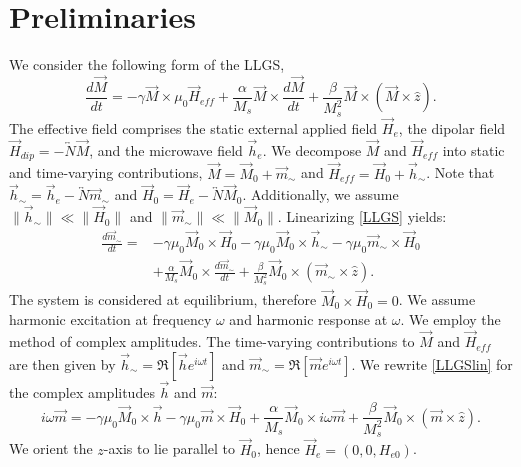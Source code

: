 \documentclass{article}
\begin{document}
\section{Preliminaries}
We consider the following form of the LLGS,
\begin{equation}\label{LLGS}
\frac{d\vec{M}}{dt} = -\gamma \vec{M} \times \mu_{0} \vec{H}_{eff} + \frac{\alpha}{M_{s}} \vec{M} \times \frac{d\vec{M}}{dt} + \frac{\beta}{M_{s}^2}\vec{M} \times (\vec{M} \times \hat{z}).
\end{equation}
The effective field comprises the static external applied field $\vec{H}_{e}$, the dipolar field $\vec{H}_{dip} = - \overleftrightarrow{N} \vec{M}$, and the microwave field $\vec{h}_{e}$. 
We decompose $\vec{M}$ and $\vec{H}_{eff}$ into static and time-varying contributions, $\vec{M} = \vec{M}_{0} + \vec{m}_{\sim}$ and $\vec{H}_{eff} = \vec{H}_{0} + \vec{h}_{\sim}$. 
Note that $\vec{h}_{\sim} = \vec{h}_{e} - \overleftrightarrow{N} \vec{m}_{\sim}$ and $\vec{H}_{0} = \vec{H}_{e} - \overleftrightarrow{N} \vec{M}_{0}$. 
Additionally, we assume $\| \vec{h}_{\sim} \| \ll \| \vec{H}_{0} \|$ and $\| \vec{m}_{\sim} \| \ll \| \vec{M}_{0} \|$. 
Linearizing \eqref{LLGS} yields:
\begin{align}\label{LLGSlin}
\frac{d\vec{m}_{\sim}}{dt} = &- \gamma \mu_{0} \vec{M}_{0} \times \vec{H}_{0} - \gamma \mu_{0} \vec{M}_{0} \times \vec{h}_{\sim} - \gamma \mu_{0} \vec{m}_{\sim} \times \vec{H}_{0} \nonumber \\
& + \frac{\alpha}{M_{s}} \vec{M}_{0} \times \frac{d\vec{m}_{\sim}}{dt} + \frac{\beta}{M_{s}^2} \vec{M}_{0} \times ( \vec{m}_{\sim} \times \hat{z} ).
\end{align}
The system is considered at equilibrium, therefore $\vec{M}_{0} \times \vec{H}_{0} = 0$. 
We assume harmonic excitation at frequency $\omega$ and harmonic response at $\omega$. 
We employ the method of complex amplitudes. 
The time-varying contributions to $\vec{M}$ and $\vec{H}_{eff}$ are then given by $\vec{h}_{\sim} = \Re [ \vec{h} e^{i \omega t} ]$ and $\vec{m}_{\sim} = \Re [ \vec{m} e^{i \omega t} ]$.
We rewrite \eqref{LLGSlin} for the complex amplitudes $\vec{h}$ and $\vec{m}$:
\begin{equation}\label{LLGSlincom}
i \omega \vec{m} = - \gamma \mu_{0} \vec{M}_{0} \times \vec{h} - \gamma \mu_{0} \vec{m} \times \vec{H}_{0} + \frac{\alpha}{M_{s}} \vec{M}_{0} \times i \omega \vec{m} + \frac{\beta}{M_{s}^2} \vec{M}_{0} \times ( \vec{m} \times \hat{z} ).
\end{equation}
We orient the $z$-axis to lie parallel to $\vec{H}_{0}$, hence $\vec{H}_{e} = (0,0,H_{e0})$. 
\end{document}
